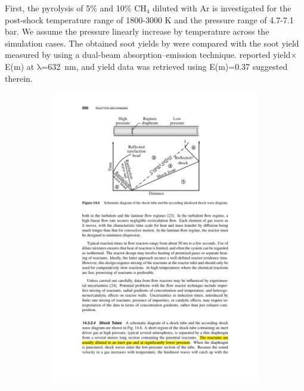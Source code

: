 First, the pyrolysis of 5\% and 10\% $\mathrm{CH_4}$ diluted with Ar is investigated for the post-shock temperature range of 1800-3000 K and the pressure range of 4.7-7.1 bar. We assume the pressure linearly increase by temperature across the simulation cases. The obtained soot yields by were compared with the soot yield measured by \citet{agafonov2016unified} using a dual-beam absorption–emission technique. \citet{agafonov2016unified} reported yield$\times$E(m) at $\mathrm{\lambda}$=632~nm, and yield data was retrieved using E(m)=0.37 suggested therein. 





\begin{figure}[!htbp]
	\centering
	\begin{subfigure}[t]{0.4\textwidth}
		\includegraphics[width=1\textwidth]{Figures/Results/Shocktube/schematics.pdf}

\end{subfigure}
\end{figure}

